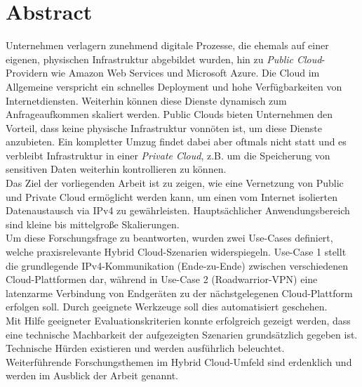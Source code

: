 \chapter{Abstract}
Unternehmen verlagern zunehmend digitale Prozesse, die ehemals auf einer eigenen, physischen Infrastruktur abgebildet wurden, hin zu \textit{Public Cloud}-Providern wie Amazon Web Services und Microsoft Azure. Die Cloud im Allgemeine verspricht ein schnelles Deployment und hohe Verfügbarkeiten von Internetdiensten. Weiterhin können diese Dienste dynamisch zum Anfrageaufkommen skaliert werden. Public Clouds bieten Unternehmen den Vorteil, dass keine physische Infrastruktur vonnöten ist, um diese Dienste anzubieten. Ein kompletter Umzug findet dabei aber oftmals nicht statt und es verbleibt Infrastruktur in einer \textit{Private Cloud}, z.B. um die Speicherung von sensitiven Daten weiterhin kontrollieren zu können.\\
Das Ziel der vorliegenden Arbeit ist zu zeigen, wie eine Vernetzung von Public und Private Cloud ermöglicht werden kann, um einen vom Internet isolierten Datenaustausch via IPv4 zu gewährleisten. Hauptsächlicher Anwendungsbereich sind kleine bis mittelgroße Skalierungen.\\
Um diese Forschungsfrage zu beantworten, wurden zwei Use-Cases definiert, welche praxisrelevante Hybrid Cloud-Szenarien widerspiegeln. Use-Case 1 stellt die grundlegende IPv4-Kommunikation (\glqq Ende-zu-Ende\grqq{}) zwischen verschiedenen Cloud-Plattformen dar, während in Use-Case 2 (\glqq Roadwarrior-VPN\grqq{}) eine latenzarme Verbindung von Endgeräten zu der nächstgelegenen Cloud-Plattform erfolgen soll. Durch geeignete Werkzeuge soll dies automatisiert geschehen.\\
Mit Hilfe geeigneter Evaluationskriterien konnte erfolgreich gezeigt werden, dass eine technische Machbarkeit der aufgezeigten Szenarien grundsätzlich gegeben ist. Technische Hürden existieren und werden ausführlich beleuchtet.\\
Weiterführende Forschungsthemen im Hybrid Cloud-Umfeld sind erdenklich und werden im Ausblick der Arbeit genannt.\\
